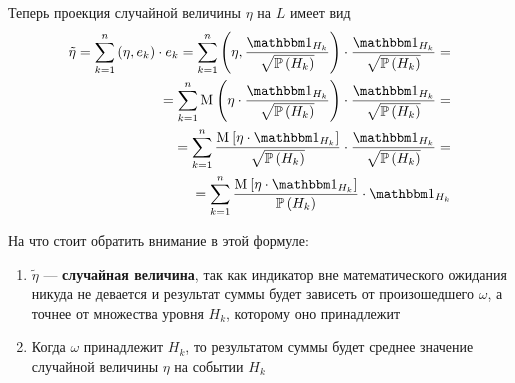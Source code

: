Теперь проекция случайной величины $\eta$ на $L$ имеет вид
\begin{equation}\label{discreteConditionalExpectation}
  \begin{split}
  \tilde{\eta}
  = \sum_{k=1}^n \left( \eta, e_k \right) \cdot e_k
  = \sum_{k=1}^n
      \left( \eta, \frac{\indicatorof{H_k}}{\sqrt{\probability{H_k}}} \right) 
      \cdot \frac{\indicatorof{H_k}}{\sqrt{\probability{H_k}}} = \\
  = \sum_{k=1}^n
      \mean{\left( \eta
      \cdot \frac{\indicatorof{H_k}}{\sqrt{\probability{H_k}}} \right)}
      \cdot \frac{\indicatorof{H_k}}{\sqrt{\probability{H_k}}} = \\
  = \sum_{k=1}^n
      \frac{\Mean{ \eta \cdot \indicatorof{H_k} }}
      {\sqrt{\probability{H_k}}}
      \cdot \frac{\indicatorof{H_k}}{\sqrt{\probability{H_k}}} = \\
  = \sum_{k=1}^n
      \frac{\Mean{\eta \cdot \indicatorof{H_k}}}{\probability{H_k}}
      \cdot \indicatorof{H_k}
  \end{split}
\end{equation}

На что стоит обратить внимание в этой формуле:
\begin{enumerate}
  \item $\tilde{\eta}$ --- \textbf{случайная величина},
      так как индикатор вне математического ожидания никуда не девается
      и результат суммы будет зависеть от произошедшего $\omega$,
      а точнее от множества уровня $H_k$, которому оно принадлежит
  \item Когда $\omega$ принадлежит $H_k$,
      то результатом суммы будет среднее значение случайной величины $\eta$
      на событии $H_k$
\end{enumerate}

